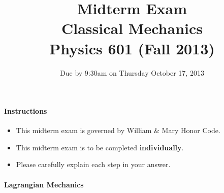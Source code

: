 \documentclass[letterpaper,11pt]{article}
\title{Midterm Exam \\ Classical Mechanics \\ Physics 601 (Fall 2013)}
\date{Due by 9:30am on Thursday October 17, 2013}
\begin{document}
\maketitle

\paragraph*{Instructions}
\begin{itemize}
 \item This midterm exam is governed by William \& Mary Honor Code.
 \item This midterm exam is to be completed \textbf{individually}.
 \item Please carefully explain each step in your answer.
\end{itemize}

\paragraph*{Lagrangian Mechanics}
\end{document}
